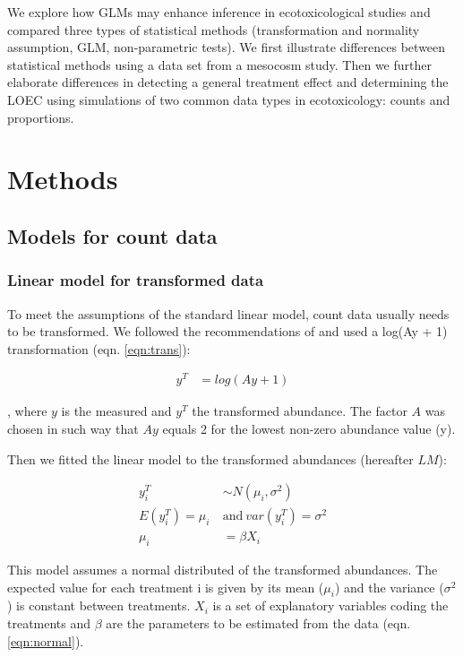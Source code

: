 \documentclass[twocolumn, natbib]{svjour3}
\begin{document}
We explore how GLMs may enhance inference in ecotoxicological studies and compared three types of statistical methods (transformation and normality assumption, GLM, non-parametric tests).
We first illustrate differences between statistical methods using a data set from a mesocosm study.
Then we further elaborate differences in detecting a general treatment effect and determining the LOEC using simulations of two common data types in ecotoxicology: counts and proportions. 



\section{Methods}
\label{sec:methods}

\subsection{Models for count data}
\subsubsection{Linear model for transformed data}
To meet the assumptions of the standard linear model, count data usually needs to be transformed. 
We followed the recommendations of \citet{van_den_brink_impact_2000} and used a log(Ay + 1) transformation (eqn. \ref{eqn:trans}):

\begin{align}
  y^T & = log(Ay + 1) \label{eqn:trans}
\end{align}

, where $y$ is the measured and $y^T$ the transformed abundance. 
The factor $A$ was chosen in such way that $Ay$ equals 2 for the lowest non-zero abundance value (y).

Then we fitted the linear model to the transformed abundances (hereafter $LM$):

\begin{align}
  y_i^T &\sim N(\mu_i, \sigma^2) \nonumber \\
  E(y_i^T) = \mu_i ~&\text{and}~ var(y_i^T) = \sigma^2 \label{eqn:normal} \\
    \mu_i &= \beta X_i  \nonumber
\end{align}

This model assumes a normal distributed of the transformed abundances.
The expected value for each treatment i is given by its mean ($\mu_i$) and the variance ($\sigma^2$) is constant between treatments.
$X_i$ is a set of explanatory variables coding the treatments and $\beta$ are the parameters to be estimated from the data (eqn. \ref{eqn:normal}).
\end{document}
